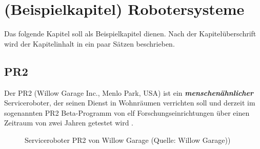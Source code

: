 \chapter{(Beispielkapitel) Robotersysteme}

Das folgende Kapitel soll als Beispielkapitel dienen. Nach der Kapitelüberschrift wird der Kapitelinhalt in ein paar Sätzen beschrieben.
\section{PR2}

Der PR2 (Willow Garage Inc., Menlo Park, USA) ist ein \textbf{\textit{menschenähnlicher}} Serviceroboter, der seinen Dienst in Wohnräumen verrichten soll und derzeit im sogenannten PR2 Beta-Programm von elf Forschungseinrichtungen über einen Zeitraum von zwei Jahren getestet wird \cite{WillowGarage2010}.\\

\begin{figure}[!ht]
	\begin{center}
	\subfigure[]{\texttt{[image: PR2-1]}}
	\hspace{5mm}
	\subfigure[]{\texttt{[image: PR2-2]}}
	\hspace{5mm}
	\subfigure[]{\texttt{[image: PR2-3]}}
	\caption{Serviceroboter PR2 von Willow Garage (Quelle: Willow Garage))}
	\label{fig.PR2}
	\end{center}
	\vspace*{-8mm}
\end{figure}




